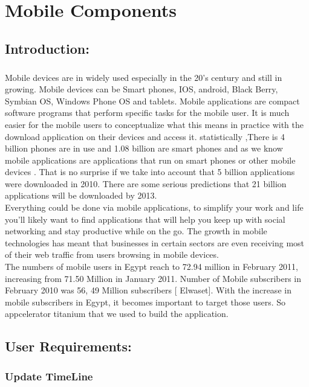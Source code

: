 \documentclass[12pt,a4paper,class,twoside,openany]{report}
\begin{document}
{\chapter{Mobile Components}
\section{ Introduction:}
 \paragraph*{\hspace{.9 cm} } Mobile devices are in widely used especially in the 20's century and still in growing. Mobile devices can be Smart phones, IOS, android, Black Berry, Symbian OS, Windows Phone OS and tablets. Mobile applications are compact software programs that perform specific tasks for the mobile user. It is much easier for the mobile users to conceptualize what this means in practice with the download application on their devices and access it. statistically ,There is 4 billion phones are in use and 1.08 billion are smart phones and as we know mobile applications are applications that run on smart phones or other mobile devices . That is no surprise if we take into account that 5 billion applications were downloaded in 2010. There are some serious predictions that 21 billion applications will be downloaded by 2013.\\
  Everything could be done via mobile applications, to simplify your work and life you'll likely want to find applications that will help you keep up with social networking and stay productive while on the go. The growth in mobile technologies has meant that businesses in certain sectors are even receiving most of their web traffic from users browsing in mobile devices.
 \\ The numbers of mobile users in Egypt reach to 72.94 million in February 2011, increasing from 71.50 Million in January 2011. Number of Mobile subscribers in February 2010 was 56, 49 Million subscribers [ Elwaset]. With the increase in mobile subscribers in Egypt, it becomes important to target those users.
So appcelerator titanium that we used to build the application.
\section{User Requirements:}
\subsection{Update TimeLine}
}
\end{document}

